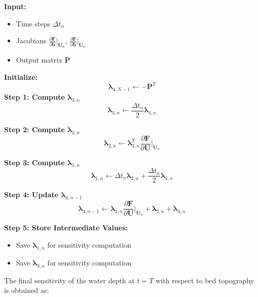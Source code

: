 \begin{algorithm}[H]
\caption{Recursive Computation of \(\boldsymbol{\lambda}\)}
\label{alg:adjoint}
\begin{algorithmic}[1]
    \State \textbf{Input:} 
    \begin{itemize}
        \item Time steps \(\Delta t_n\)
        \item Jacobians \(\frac{\partial \mathbf{F}}{\partial \mathbf{b}}\big|_{\mathbf{U}_n}\), \(\frac{\partial \mathbf{F}}{\partial \mathbf{b}}\big|_{\widetilde{\mathbf{U}}_n}\)
        \item Output matrix \(\mathbf{P}\)
    \end{itemize}
    \State \textbf{Initialize:} 
    \[
    \boldsymbol{\lambda}_{4,N-1} \gets -\mathbf{P}^T
    \]
        \State \textbf{Step 1: Compute \(\boldsymbol{\lambda}_{3,n}\)}
        \[
        \boldsymbol{\lambda}_{3,n} \gets \frac{\Delta t_n}{2} \boldsymbol{\lambda}_{4,n}
        \]

        \State \textbf{Step 2: Compute \(\boldsymbol{\lambda}_{2,n}\)}
        \[
        \boldsymbol{\lambda}_{2,n} \gets \boldsymbol{\lambda}_{3,n}^T \frac{\partial \mathbf{F}}{\partial \mathbf{U}} \big|_{\widetilde{\mathbf{U}}_n}
        \]

        \State \textbf{Step 3: Compute \(\boldsymbol{\lambda}_{1,n}\)}
        \[
        \boldsymbol{\lambda}_{1,n} \gets \Delta t_n \boldsymbol{\lambda}_{2,n} + \frac{\Delta t_n}{2} \boldsymbol{\lambda}_{4,n}
        \]

        \State \textbf{Step 4: Update \(\boldsymbol{\lambda}_{4,n-1}\)}
        \[
        \boldsymbol{\lambda}_{4,n-1} \gets \boldsymbol{\lambda}_{1,n} \frac{\partial \mathbf{F}}{\partial \mathbf{U}} \big|_{\mathbf{U}_n} + \boldsymbol{\lambda}_{2,n} + \boldsymbol{\lambda}_{4,n}
        \]

        \State \textbf{Step 5: Store Intermediate Values:}
        \begin{itemize}
            \item Save \(\boldsymbol{\lambda}_{1,n}\) for sensitivity computation
            \item Save \(\boldsymbol{\lambda}_{3,n}\) for sensitivity computation
        \end{itemize}
    \EndFor
\end{algorithmic}
\end{algorithm}

The final sensitivity of the water depth at \( t = T \) with respect to bed topography is obtained as:

